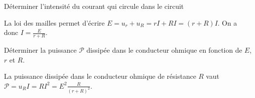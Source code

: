 \smallskip

\debutEntrainement



\begin{enonce}
Déterminer l'intensité du courant qui circule dans le circuit
\end{enonce}


\begin{corrige}
La loi des mailles permet d'écrire $E=u_r+u_R=rI+RI=(r+R)I$. On a donc $I=\frac{E}{r+R}$.
\end{corrige}




\begin{enonce}
Déterminer la puissance $\mathcal{P}$ dissipée dans le conducteur ohmique en fonction de $E$, $r$ et $R$.

\end{enonce}


\begin{corrige}
La puissance dissipée dans le conducteur ohmique de résistance $R$ vaut $\mathcal{P}=u_R I=RI^2=E^2\frac{R}{(r+R)^2}$.
\end{corrige}


\finEntrainement






\hauteurLargeurCadreReponse		{8mm}{4cm}
\typeEntrainement				{} %
\initialisationEntrainement



